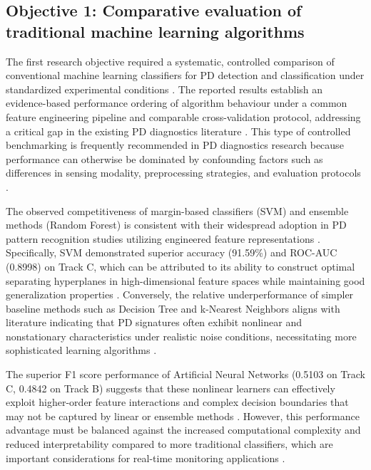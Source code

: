 \subsection{Objective 1: Comparative evaluation of traditional machine learning algorithms}

The first research objective required a systematic, controlled comparison of conventional machine learning classifiers for PD detection and classification under standardized experimental conditions \parencite{Aldosari_2023, Srivastava_2023_1}. The reported results establish an evidence-based performance ordering of algorithm behaviour under a common feature engineering pipeline and comparable cross-validation protocol, addressing a critical gap in the existing PD diagnostics literature \parencite{Amaya_Sanchez_2024, Sikorski_2025}. This type of controlled benchmarking is frequently recommended in PD diagnostics research because performance can otherwise be dominated by confounding factors such as differences in sensing modality, preprocessing strategies, and evaluation protocols \parencite{Vera_2023_1, Sikorski_2025}.

The observed competitiveness of margin-based classifiers (SVM) and ensemble methods (Random Forest) is consistent with their widespread adoption in PD pattern recognition studies utilizing engineered feature representations \parencite{Govindarajan_2021_2, Aldosari_2023}. Specifically, SVM demonstrated superior accuracy (91.59\%) and ROC-AUC (0.8998) on Track C, which can be attributed to its ability to construct optimal separating hyperplanes in high-dimensional feature spaces while maintaining good generalization properties \parencite{Govindarajan_2021_2, Aldosari_2023}. Conversely, the relative underperformance of simpler baseline methods such as Decision Tree and k-Nearest Neighbors aligns with literature indicating that PD signatures often exhibit nonlinear and nonstationary characteristics under realistic noise conditions, necessitating more sophisticated learning algorithms \parencite{Friebe_2024, Long_2024}.

The superior F1 score performance of Artificial Neural Networks (0.5103 on Track C, 0.4842 on Track B) suggests that these nonlinear learners can effectively exploit higher-order feature interactions and complex decision boundaries that may not be captured by linear or ensemble methods \parencite{Aldosari_2023, Srivastava_2023_1}. However, this performance advantage must be balanced against the increased computational complexity and reduced interpretability compared to more traditional classifiers, which are important considerations for real-time monitoring applications \parencite{Klein_2024_1, Sikorski_2025}.

